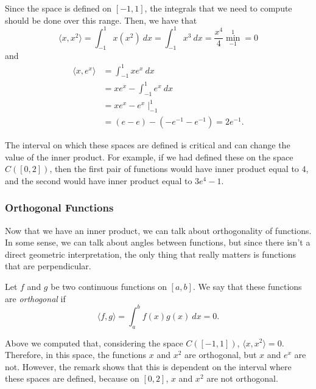 \documentclass{ximera}
\begin{document}
\begin{exampleSol}
    Since the space is defined on $[-1,1]$, the integrals that we need to compute should be done over this range. Then, we have that
    \[
        \langle x, x^2 \rangle = \int_{-1}^1 x(x^2)\ dx = \int_{-1}^1 x^3\ dx = \frac{x^4}{4}\min_{-1}^1 = 0 
    \]
    and
    \[ 
        \begin{split}
            \langle x, e^x \rangle &= \int_{-1}^1 xe^x\ dx \\
            &= xe^x - \int_{-1}^1 e^x\ dx \\
            &= xe^x - e^x \mid_{-1}^1 \\
            &= (e - e) - (-e^{-1} - e^{-1}) = 2e^{-1} .
        \end{split}
    \]
\end{exampleSol}

\begin{remark}
    The interval on which these spaces are defined is critical and can change the value of the inner product. For example, if we had defined these on the space $C([0,2])$, then the first pair of functions would have inner product equal to $4$, and the second would have inner product equal to $3e^4 - 1$.
\end{remark}

\subsubsection{Orthogonal Functions}

Now that we have an inner product, we can talk about orthogonality of functions. In some sense, we can talk about angles between functions, but since there isn't a direct geometric interpretation, the only thing that really matters is functions that are perpendicular. 

\begin{definition}
    Let $f$ and $g$ be two continuous functions on $[a,b]$. We say that these functions are \emph{orthogonal} if 
    \[ 
        \langle f, g \rangle = \int_a^b f(x)g(x)\ dx = 0. 
    \]
\end{definition}

Above we computed that, considering the space $C([-1,1])$, $\langle x, x^2 \rangle = 0$. Therefore, in this space, the functions $x$ and $x^2$ are orthogonal, but $x$ and $e^x$ are not. However, the remark shows that this is dependent on the interval where these spaces are defined, because on $[0,2]$, $x$ and $x^2$ are not orthogonal.
\end{document}
